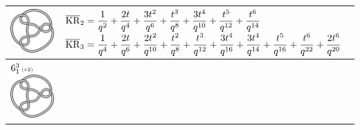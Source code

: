 \documentclass{compositio}
\theoremstyle{definition}
\numberwithin{equation}{section}
\begin{document}
{\begin{longtable}{p{}|p{}}
\includegraphics[scale=0.07,angle=0]{link6_1_3.pdf} 
& 
\newline
$
\displaystyle{%
\overline{\KR}_{2} = \frac{1}{q^2}+\frac{2 t}{q^4}+\frac{3 t^2}{q^6}+\frac{t^3}{q^8}+\frac{3 t^4}{q^{10}}+\frac{t^5}{q^{12}}+\frac{t^6}{q^{14}}
}
$
\newline 
$
\displaystyle{%
\overline{\KR}_{3} = \frac{1}{q^4}+\frac{2 t}{q^6}+\frac{2 t^2}{q^{10}}+\frac{t^2}{q^8}+\frac{t^3}{q^{12}}+\frac{3 t^4}{q^{16}}+\frac{3 t^4}{q^{14}}+\frac{t^5}{q^{16}}+\frac{t^6}{q^{22}}+\frac{2 t^6}{q^{20}}
}
$
\newline
\\
\hline
$6_{1}^3\,\text{{\tiny (v2)}}$ 
\includegraphics[scale=0.07,angle=0]{link6_1_3.pdf} 

\end{longtable}}
\end{document}
